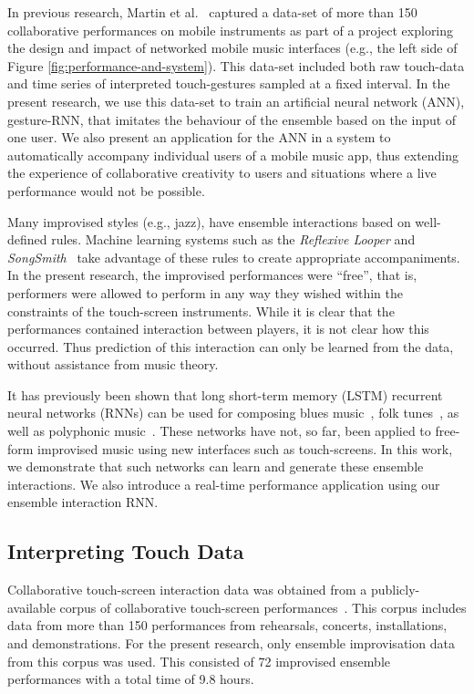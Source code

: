 \documentclass[sigchi]{acmart} %
\begin{document}
In previous research, Martin et al.~\cite{Martin:2016rm} captured a
data-set of more than 150 collaborative performances on mobile
instruments as part of a project exploring the design and impact of
networked mobile music interfaces (e.g., the left side of Figure
\ref{fig:performance-and-system}). This data-set included both raw
touch-data and time series of interpreted touch-gestures sampled at a
fixed interval. In the present research, we use this data-set to train
an artificial neural network (ANN), gesture-RNN, that imitates the
behaviour of the ensemble based on the input of one user. We also
present an application for the ANN in a system to automatically
accompany individual users of a mobile music app, thus extending the
experience of collaborative creativity to users and situations where a
live performance would not be possible.

Many improvised styles (e.g., jazz), have ensemble interactions based
on well-defined rules. Machine learning systems such as the
\emph{Reflexive Looper}\cite{Pachet:2013kq} and
\emph{SongSmith}~\cite{Morris:2008qe} take advantage of these rules to
create appropriate accompaniments. In the present research, the
improvised performances were ``free'', that is, performers were
allowed to perform in any way they wished within the constraints of
the touch-screen instruments. While it is clear that the performances
contained interaction between players, it is not clear how this
occurred. Thus prediction of this interaction can only be learned from
the data, without assistance from music theory.

It has previously been shown that long short-term memory (LSTM)
recurrent neural networks (RNNs) can be used for composing blues
music~\cite{Eck:2007rw}, folk tunes~\cite{Sturm:2016rz}, as well as
polyphonic music~\cite{Walder:2016le}. These networks have not, so
far, been applied to free-form improvised music using new interfaces
such as touch-screens. In this work, we demonstrate that such networks
can learn and generate these ensemble interactions. We also introduce
a real-time performance application using our ensemble interaction
RNN.

\subsection{Interpreting Touch Data}

Collaborative touch-screen interaction data was obtained from a
publicly-available corpus of collaborative touch-screen
performances~\cite{Martin:2016fc}. This corpus includes data from more
than 150 performances from rehearsals, concerts, installations, and
demonstrations. For the present research, only ensemble improvisation
data from this corpus was used. This consisted of 72 improvised
ensemble performances with a total time of 9.8 hours.
\end{document}
